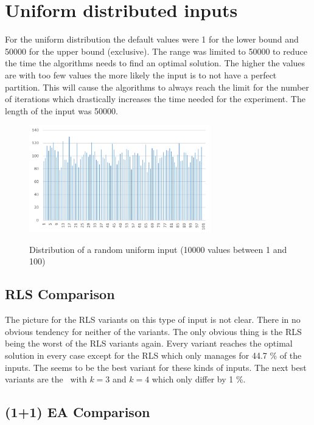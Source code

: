 \section{Uniform distributed inputs}
For the uniform distribution the default values were 1 for the lower bound and 50000 for the upper bound (exclusive).
The range was limited to 50000 to reduce the time the algorithms needs to find an optimal solution.
The higher the values are with too few values the more likely the input is to not have a perfect partition\cite{borgs2001phase}.
This will cause the algorithms to always reach the limit for the number of iterations which drastically increases the time needed for the experiment.
The length of the input was 50000.


\begin{figure}[h]
      \caption{Distribution of a random uniform input (10000 values between 1 and 100)}
      \centering
      \includegraphics[width=0.7\textwidth]{figures/images/numberGenerator/uniformDistributionMin1Max101n10000.png}\label{fig:uniDistExample}
\end{figure}
\subsection{RLS Comparison}




The picture for the RLS variants on this type of input is not clear.
There in no obvious tendency for neither of the variants.
The only obvious thing is the RLS being the worst of the RLS variants again.
Every variant reaches the optimal solution in every case except for the RLS which only manages for 44.7 \% of the inputs.
The \RLSN[2] seems to be the best variant for these kinds of inputs.
The next best variants are the \RLSR~with $k=3$ and $k=4$ which only differ by 1 \%.

\subsection{(1+1) EA Comparison}


